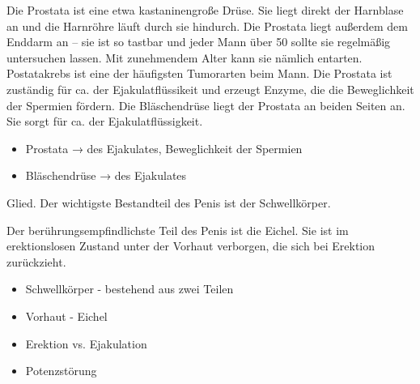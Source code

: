 {%
Die Prostata ist eine etwa kastaninengroße Drüse. Sie liegt
direkt der Harnblase an und die Harnröhre läuft durch sie
hindurch. Die Prostata liegt außerdem dem Enddarm an -- sie
ist so tastbar und jeder Mann über 50 sollte sie regelmäßig
untersuchen lassen. Mit zunehmendem Alter kann sie
nämlich entarten. Postatakrebs ist eine der häufigsten
Tumorarten beim Mann.
Die Prostata ist zuständig für ca. \Z{30\PC*} der
Ejakulatflüssikeit und erzeugt Enzyme, die die Beweglichkeit
der Spermien fördern.
Die Bläschendrüse liegt der Prostata an beiden Seiten an.
Sie sorgt für ca. \Z{60\PC*} der Ejakulatflüssigkeit.
}
{
\begin{itemize}
  \item Prostata → \Z{30\PC*} des Ejakulates, Beweglichkeit der Spermien
  \item Bläschendrüse → \Z{60\PC*} des Ejakulates
\end{itemize}
}{}{}{}


{%
 Glied.
Der wichtigste Bestandteil des Penis ist der Schwellkörper.

Der berührungsempfindlichste Teil des Penis ist die Eichel.
Sie ist im erektionslosen Zustand unter der Vorhaut
verborgen, die sich bei Erektion zurückzieht.
}
{
\begin{itemize}
  \item Schwellkörper - bestehend aus zwei Teilen
  \item Vorhaut - Eichel
  \item Erektion vs. Ejakulation
  \item Potenzstörung
\end{itemize}
}{}{}{}


